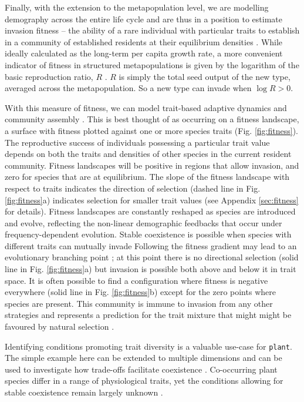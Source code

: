 \documentclass[a4paper,11pt]{article}
\newcommand{\plant}{\texttt{plant}}
\begin{document}
Finally, with the extension to the metapopulation level, we are
modelling demography across the entire life cycle and are thus in a
position to estimate invasion fitness -- the ability of a rare
individual with particular traits to establish in a community of
established residents at their equilibrium densities
\citep{Geritz-1998,Dieckmann-2007}.  While ideally calculated as the
long-term per capita growth rate, a more convenient indicator of
fitness in structured metapopulations is given by the
logarithm of the basic reproduction ratio, \(R\)
\citep{Gyllenberg-2001, Metz-2001}.
\(R\) is simply the total seed output of the new type, averaged across
the metapopulation. So a new type can invade when \(\log R > 0\).

With this measure of fitness, we can model trait-based adaptive
dynamics and community assembly \citep{Falster-2015}. This is best
thought of as occurring on a fitness landscape, a surface with fitness
plotted against one or more species traits
(Fig. \ref{fig:fitness}). The reproductive success of individuals
possessing a particular trait value depends on both the traits and
densities of other species in the current resident community. Fitness
landscapes will be positive in regions that allow invasion, and zero
for species that are at equilibrium. The slope of the fitness
landscape with respect to traits indicates the direction of selection
(dashed line in Fig. \ref{fig:fitness}a) indicates selection for
smaller trait values (see Appendix \ref{sec:fitness} for
details). Fitness landscapes are constantly reshaped as species are
introduced and evolve, reflecting the non-linear demographic feedbacks
that occur under frequency-dependent evolution. Stable coexistence is
possible when species with different traits can mutually invade
\citep{Geritz-1998} Following the fitness gradient may lead to an
evolutionary branching point \citep{Geritz-1998,Dieckmann-2007}; at
this point there is no directional selection (solid line in
Fig. \ref{fig:fitness}a) but invasion is possible both above and below
it in trait space. It is often possible to find a configuration where
fitness is negative everywhere (solid line in Fig. \ref{fig:fitness}b)
except for the zero points where species are present. This community
is immune to invasion from any other strategies and represents a
prediction for the trait mixture that might might be favoured by
natural selection \citep{Geritz-1998,Falster-2015}.

Identifying conditions promoting trait diversity is a valuable use-case
for {\plant}. The simple example here can be extended to multiple dimensions
and can be used to investigate how trade-offs facilitate coexistence
\citep{Falster-2015}. Co-occurring plant species differ in a range of physiological
traits, yet the conditions allowing for stable coexistence remain largely
unknown \citep{Adler-2013}. 
\end{document}
